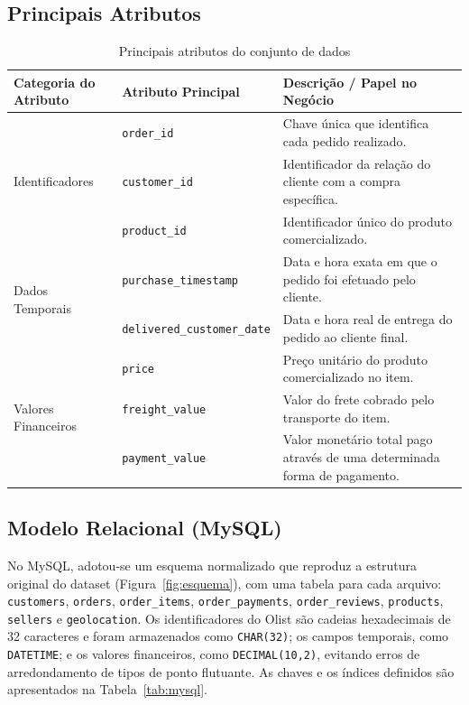 \documentclass[12pt]{article}
\begin{document}
\subsection{Principais Atributos}

\begin{table}[htbp]
  \centering
  \caption{Principais atributos do conjunto de dados}
  \label{tab:atributos}
  \begin{tabularx}{\textwidth}{l l X}
    \toprule
    \textbf{Categoria do Atributo} & \textbf{Atributo Principal} & \textbf{Descrição / Papel no Negócio} \\
    \midrule
    \multirow{3}{*}{Identificadores}
      & \texttt{order\_id}    & Chave única que identifica cada pedido realizado. \\
      & \texttt{customer\_id} & Identificador da relação do cliente com a compra específica. \\
      & \texttt{product\_id}  & Identificador único do produto comercializado. \\
    \midrule
    \multirow{2}{*}{Dados Temporais}
      & \texttt{purchase\_timestamp}      & Data e hora exata em que o pedido foi efetuado pelo cliente. \\
      & \texttt{delivered\_customer\_date} & Data e hora real de entrega do pedido ao cliente final. \\
    \midrule
    \multirow{3}{*}{Valores Financeiros}
      & \texttt{price}         & Preço unitário do produto comercializado no item. \\
      & \texttt{freight\_value} & Valor do frete cobrado pelo transporte do item. \\
      & \texttt{payment\_value} & Valor monetário total pago através de uma determinada forma de pagamento. \\
    \bottomrule
  \end{tabularx}
\end{table}

\subsection{Modelo Relacional (MySQL)}

No MySQL, adotou-se um esquema normalizado que reproduz a estrutura original
do dataset (Figura~\ref{fig:esquema}), com uma tabela para cada arquivo:
\texttt{customers}, \texttt{orders}, \texttt{order\_items},
\texttt{order\_payments}, \texttt{order\_reviews}, \texttt{products},
\texttt{sellers} e \texttt{geolocation}. Os identificadores do Olist são
cadeias hexadecimais de 32 caracteres e foram armazenados como
\texttt{CHAR(32)}; os campos temporais, como \texttt{DATETIME}; e os
valores financeiros, como \texttt{DECIMAL(10,2)}, evitando erros de
arredondamento de tipos de ponto flutuante. As chaves e os índices
definidos são apresentados na Tabela~\ref{tab:mysql}.
\end{document}
